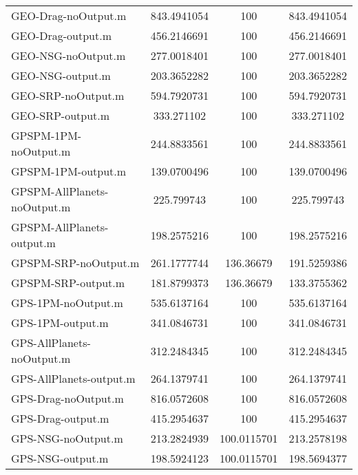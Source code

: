 \begin{table}[htbp!]
\begin{tabular}{lccc}
         GEO-Drag-noOutput.m & 843.4941054 & 100 & 843.4941054 \\
         GEO-Drag-output.m & 456.2146691 & 100 & 456.2146691 \\
         GEO-NSG-noOutput.m & 277.0018401 & 100 & 277.0018401 \\
         GEO-NSG-output.m & 203.3652282 & 100 & 203.3652282 \\
         GEO-SRP-noOutput.m & 594.7920731 & 100 & 594.7920731 \\
         GEO-SRP-output.m & 333.271102 & 100 & 333.271102 \\
         GPSPM-1PM-noOutput.m & 244.8833561 & 100 & 244.8833561 \\
         GPSPM-1PM-output.m & 139.0700496 & 100 & 139.0700496 \\
         GPSPM-AllPlanets-noOutput.m & 225.799743 & 100 & 225.799743 \\
         GPSPM-AllPlanets-output.m & 198.2575216 & 100 & 198.2575216 \\
         GPSPM-SRP-noOutput.m & 261.1777744 & 136.36679 & 191.5259386 \\
         GPSPM-SRP-output.m & 181.8799373 & 136.36679 & 133.3755362 \\
         GPS-1PM-noOutput.m & 535.6137164 & 100 & 535.6137164 \\
         GPS-1PM-output.m & 341.0846731 & 100 & 341.0846731 \\
         GPS-AllPlanets-noOutput.m & 312.2484345 & 100 & 312.2484345 \\
         GPS-AllPlanets-output.m & 264.1379741 & 100 & 264.1379741 \\
         GPS-Drag-noOutput.m & 816.0572608 & 100 & 816.0572608 \\
         GPS-Drag-output.m & 415.2954637 & 100 & 415.2954637 \\
         GPS-NSG-noOutput.m & 213.2824939 & 100.0115701 & 213.2578198 \\
         GPS-NSG-output.m & 198.5924123 & 100.0115701 & 198.5694377 \\

\end{tabular}
\end{table}
